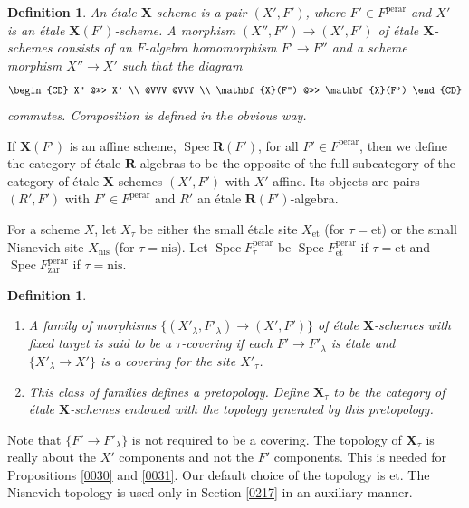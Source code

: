 \documentclass{amsart}
\newtheorem{Def}[Thm]{Definition}
\theoremstyle{remark}
\numberwithin{equation}{subsection}
\newcommand{\et}{\mathrm{et}}
\newcommand{\zar}{\mathrm{zar}}
\newcommand{\perar}{\mathrm{perar}}
\newcommand{\alg}[1]{\mathbf{#1}}
\newcommand{\nis}{\mathrm{nis}}
\DeclareMathOperator{\Spec}{Spec}
\begin{document}
\begin{Def} \label{0160}
	An \emph{\'etale $\alg{X}$-scheme} is a pair $(X', F')$,
	where $F' \in F^{\perar}$ and $X'$ is an \'etale $\alg{X}(F')$-scheme.
	A morphism $(X'', F'') \to (X', F')$ of \'etale $\alg{X}$-schemes
	consists of an $F$-algebra homomorphism $F' \to F''$
	and a scheme morphism $X'' \to X'$ such that the diagram
		\[
			\begin{CD}
					X''
				@>>>
					X'
				\\ @VVV @VVV \\
					\alg{X}(F'')
				@>>>
					\alg{X}(F')
			\end{CD}
		\]
	commutes.
	Composition is defined in the obvious way.
\end{Def}

If $\alg{X}(F')$ is an affine scheme, $\Spec \alg{R}(F')$, for all $F' \in F^{\perar}$,
then we define the category of \'etale $\alg{R}$-algebras to be the opposite of
the full subcategory of the category of \'etale $\alg{X}$-schemes $(X', F')$ with $X'$ affine.
Its objects are pairs $(R', F')$ with $F' \in F^{\perar}$
and $R'$ an \'etale $\alg{R}(F')$-algebra.

For a scheme $X$,
let $X_{\tau}$ be either the small \'etale site
$X_{\et}$ (for $\tau = \et$) or
the small Nisnevich site $X_{\nis}$ (for $\tau = \nis$).
Let $\Spec F^{\perar}_{\tau}$ be $\Spec F^{\perar}_{\et}$ if $\tau = \et$
and $\Spec F^{\perar}_{\zar}$ if $\tau = \nis$.

\begin{Def} \mbox{}
	\begin{enumerate}
		\item
			A family of morphisms $\{(X'_{\lambda}, F'_{\lambda}) \to (X', F')\}$
			of \'etale $\alg{X}$-schemes with fixed target
			is said to be a $\tau$-covering
			if each $F' \to F'_{\lambda}$ is \'etale
			and $\{X'_{\lambda} \to X'\}$ is a covering for the site $X'_{\tau}$.
		\item
			This class of families defines a pretopology.
			Define $\alg{X}_{\tau}$ to be the category of \'etale $\alg{X}$-schemes
			endowed with the topology generated by this pretopology.
	\end{enumerate}
\end{Def}

Note that $\{F' \to F'_{\lambda}\}$ is not required to be a covering.
The topology of $\alg{X}_{\tau}$ is really about the $X'$ components
and not the $F'$ components.
This is needed for Propositions \ref{0030} and \ref{0031}.
Our default choice of the topology is $\et$.
The Nisnevich topology is used only in
Section \ref{0217} in an auxiliary manner.
\end{document}
